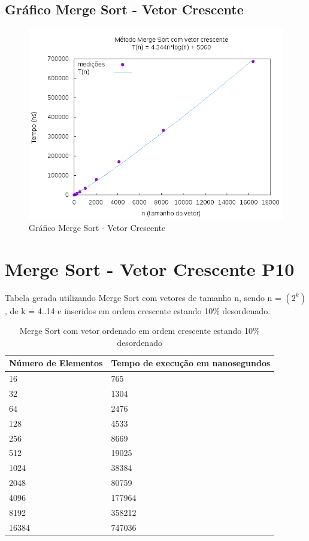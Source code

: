 \documentclass[12pt,a4paper,twoside]{report}
\begin{document}
\subsection{Gráfico Merge Sort - Vetor Crescente}
\begin{figure}[H]
    \centering
    \includegraphics[width=0.7\linewidth]{graficos/MergeSort/vIntCrescente/vIntCrescente.png}
  \caption{Gráfico Merge Sort - Vetor Crescente}
\end{figure}

\section{Merge Sort - Vetor Crescente P10}
Tabela gerada utilizando Merge Sort com vetores de tamanho n, sendo n = $(2^k)$, de k = 4..14 e inseridos em ordem crescente estando 10\% desordenado.
\begin{table}[H]
\centering
\caption{Merge Sort com vetor ordenado em ordem crescente estando 10\% desordenado}
\label{my-label}
\begin{tabular}{|l|l|}
\hline
\multicolumn{1}{|c|}{\textbf{Número de Elementos}} & \multicolumn{1}{c|}{\textbf{Tempo de execução em nanosegundos}} \\ \hline
16 & 765 \\ \hline
32 & 1304 \\ \hline
64 & 2476 \\ \hline
128 & 4533 \\ \hline
256 & 8669 \\ \hline
512 & 19025 \\ \hline
1024 & 38384 \\ \hline
2048 & 80759 \\ \hline
4096 & 177964 \\ \hline
8192 & 358212 \\ \hline
16384 & 747036 \\ \hline
\end{tabular}
\end{table}
\end{document}
